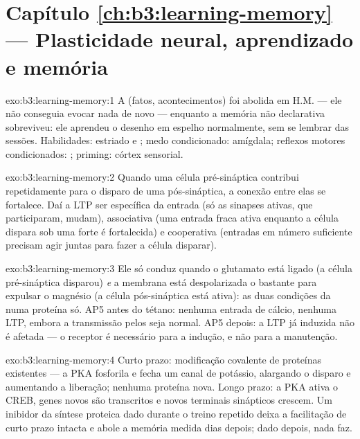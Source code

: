 \section*{Capítulo \ref{ch:b3:learning-memory} --- Plasticidade neural, aprendizado e memória}

\begin{solution}{exo:b3:learning-memory:1}
A  (fatos, acontecimentos) foi abolida em H.M. --- ele
não conseguia evocar nada de novo --- enquanto a memória não declarativa
sobreviveu: ele aprendeu o desenho em espelho normalmente, sem se lembrar
das sessões. Habilidades: estriado e ; medo condicionado:
amígdala; reflexos motores condicionados: ; priming: córtex
sensorial.
\end{solution}

\begin{solution}{exo:b3:learning-memory:2}
Quando uma célula pré-sináptica contribui repetidamente para o disparo
de uma pós-sináptica, a conexão entre elas se fortalece. Daí a LTP ser
específica da entrada (só as sinapses ativas, que participaram, mudam),
associativa (uma entrada fraca ativa enquanto a célula dispara sob uma
forte é fortalecida) e cooperativa (entradas em número suficiente
precisam agir juntas para fazer a célula disparar).
\end{solution}

\begin{solution}{exo:b3:learning-memory:3}
Ele só conduz quando o glutamato está ligado (a célula pré-sináptica
disparou) \emph{e} a membrana está despolarizada o bastante para expulsar
o magnésio (a célula pós-sináptica está ativa): as duas condições da
 numa proteína só. AP5 antes do tétano: nenhuma entrada de
cálcio, nenhuma LTP, embora a transmissão pelos  seja
normal. AP5 depois: a LTP já induzida não é afetada --- o receptor é
necessário para a indução, e não para a manutenção.
\end{solution}

\begin{solution}{exo:b3:learning-memory:4}
Curto prazo: modificação covalente de proteínas existentes --- a PKA
fosforila e fecha um canal de potássio, alargando o disparo e aumentando
a liberação; nenhuma proteína nova. Longo prazo: a PKA ativa o CREB,
genes novos são transcritos e novos terminais sinápticos crescem. Um
inibidor da síntese proteica dado durante o treino repetido deixa a
facilitação de curto prazo intacta e abole a memória medida dias depois;
dado depois, nada faz.
\end{solution}

